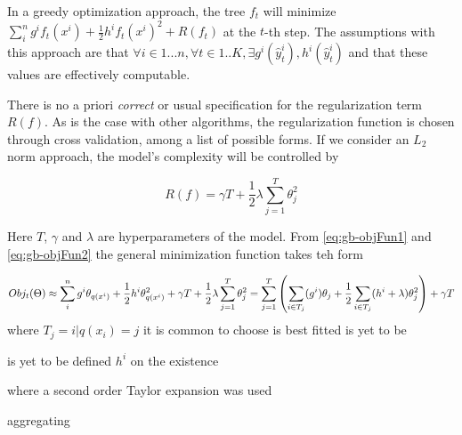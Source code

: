 In a greedy optimization approach, the tree $f_t$ will minimize $\sum_i^n {  g^i f_t(x^i) + \frac{1}{2} h^i f_t(x^i)^2 } + R(f_t)$ at the $t$-th step. The assumptions with this approach are that $ \forall i \in {1...n}, \forall t \in {1..K}, \exists g^i(\hat{y}_{t}^i), h^i(\hat{y}_{t}^i) $ and that these values are effectively computable.

There is no a priori \textit{correct} or usual specification for the regularization term $R(f)$. As is the case with other algorithms, the regularization function is chosen through cross validation, among a list of possible forms. If we consider an $L_2$ norm approach, the model's complexity will be controlled by 

\begin{equation} \label{eq:gb-objFun2}
R(f) =  \gamma T + \frac{1}{2}\lambda \sum_{j=1}^T\theta_j^2 
\end{equation}

Here $T$, $\gamma$ and $\lambda$ are hyperparameters of the model. From \ref{eq:gb-objFun1} and \ref{eq:gb-objFun2} the general minimization function takes teh form

\begin{equation} \label{eq:gb-objFun}

    Obj_t(\Theta) \approx  \sum_i^n {g^i \theta_{q(x^i)} + \frac{1}{2} h^i \theta_{q(x^i)}^2 } + \gamma T 
        + \frac{1}{2}\lambda \sum_{j=1}^T\theta_j^2 \\
          =   \sum_{j=1}^T\left(  \sum_{i \in T_j} (g^i )\theta_{j} + \frac{1}{2} \sum_{i \in T_j} (h^i + \lambda ) \theta_{j}^2  \right) + \gamma T \\
\end{equation}
where $T_j = {i | q(x_i)= j}$
it is common to choose is best fitted
is yet to be 

is  yet to be defined
$h^i$ on the existence 

where a second order Taylor expansion was used 

aggregating 








